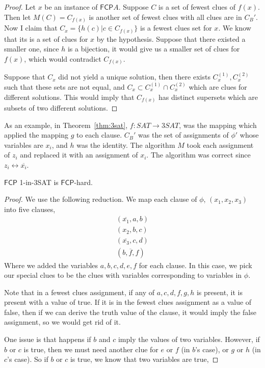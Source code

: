 \documentclass[runningheads,a4paper]{llncs}
\begin{document}
\begin{proof}
Let $x$ be an instance of $\mathsf{FCP} A$. Suppose $C$ is a set of fewest clues of $f(x)$. Then let $M(C) = C_{f(x)}$ is another set of fewest clues with all clues are in $C_B'$. Now I claim that $C_x = \{ h(c) | c \in C_{f(x)}\}$ is a fewest clues set for $x$. We know that its is a set of clues for $x$ by the hypothesis. Suppose that there existed a smaller one, since $h$ is a bijection, it would give us a smaller set of clues for $f(x)$, which would contradict $C_{f(x)}$. 

Suppose that $C_x$ did not yield a unique solution, then there exists $C_{x}^{(1)}, C_x^{(2)}$ such that these sets are not equal, and $C_x \subset C_{x}^{(1)} \cap C_x^{(2)}$ which are clues for different solutions. This would imply that $C_{f(x)}$ has distinct supersets which are subsets of two different solutions.
\end{proof}

As an example, in Theorem~\ref{thm:3sat}, $f: SAT \rightarrow 3SAT$, was the mapping which applied the mapping $g$ to each clause. $C_B'$ was the set of assignments of $\phi'$ whose variables are $x_i$, and $h$ was the identity. The algorithm $M$ took each assignment of $z_i$ and replaced it with an assignment of $x_i$. The algorithm was correct since $z_i \leftrightarrow \overline{x_i}$.

\begin{lemma}
$\mathsf{FCP}$ 1-in-3SAT is $\mathsf{FCP}$-hard. 
\end{lemma}

\begin{proof}
We use the following reduction. We map each clause of $\phi$, $(x_1, x_2, x_3)$ into five clauses,
\[ \begin{array}{c} 
(\overline{x_1}, a, b) \\
(x_2, b, c) \\
(\overline{x_3}, c, d) \\
(b, \overline{f}, f) 
\end{array} \]
Where we added the variables $a, b, c, d, e, f$ for each clause. 
In this case, we pick our special clues to be the clues with variables corresponding to variables in $\phi$. 

Note that in a fewest clues assignment, if any of $a,c,d,f, g, h$ is present, it is present with a value of true. If it is in the fewest clues assignment as a value of false, then if we can derive the truth value of the clause, it would imply the false assignment, so we would get rid of it. 

One issue is that happens if $b$ and $c$ imply the values of two variables. However, if $b$ or $c$ is true, then we must need another clue for $e$ or $f$ (in $b$'s case), or $g$ or $h$ (in $c$'s case). So if $b$ or $c$ is true, we know that two variables are true, 
\end{proof}
\end{document}
